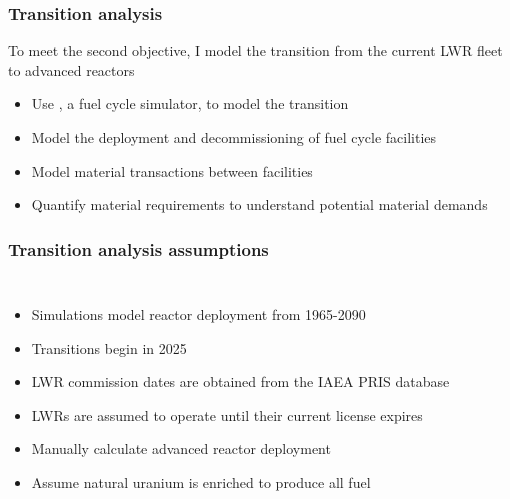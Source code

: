 \begin{frame}
    \frametitle{Transition analysis}
    To meet the second objective, I model the transition from the current 
    \gls{LWR} fleet to advanced reactors
    \begin{itemize}
        \item<2-> Use \Cyclus \cite{huff_fundamental_2016}, 
              a fuel cycle simulator, to model the transition
        \item<3-> Model the deployment and decommissioning of fuel cycle facilities 
        \item<3-> Model material transactions between facilities
        \item<4-> Quantify material requirements to understand potential material
              demands
    \end{itemize}

\end{frame}

\begin{frame}
    \frametitle{Transition analysis assumptions}
    \begin{columns}
        
    \column[t]{6cm}
    \vspace{-0.9cm}
    

        \column[t]{4.5cm}
        \begin{itemize}
            \item Simulations model reactor deployment from 1965-2090
            \item Transitions begin in 2025
            \item \gls{LWR} commission dates are obtained from the IAEA PRIS
                database \cite{noauthor_power_1989}
            \item \glspl{LWR} are assumed to operate until their current license 
                expires
            \item<2-> Manually calculate advanced reactor deployment
            \item<2-> Assume natural uranium is enriched to produce all 
                  fuel
        \end{itemize}

\end{columns}
\end{frame}

